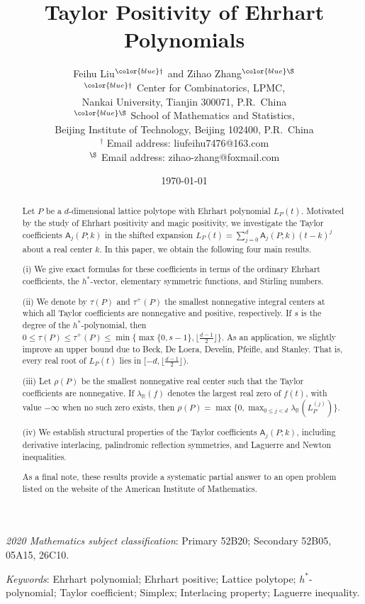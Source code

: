 \documentclass[reqno, 12pt]{article}
\title{Taylor Positivity of Ehrhart Polynomials}
\author{Feihu Liu$^{\color{blue} \dag}$ and Zihao Zhang$^{\color{blue} \S}$
\\[2mm]
{\small $^{\color{blue} \dag}$ Center for Combinatorics, LPMC,}\\[-0.8ex]
{\small Nankai University, Tianjin 300071, P.R.~China}\\
{\small $^{\color{blue} \S}$ School of Mathematics and Statistics,}\\[-0.8ex]
{\small Beijing Institute of Technology, Beijing 102400, P.R.~China}\\
{\small {\color{blue} $^\dag$} Email address: liufeihu7476@163.com}\\
{\small {\color{blue} $^\S$} Email address: zihao-zhang@foxmail.com}\\
}
\date{\today}
\numberwithin{equation}{section}
\theoremstyle{definition}
\newcommand{\A}{\mathsf{A}}
\begin{document}
\maketitle

\begin{abstract}
Let $P$ be a $d$-dimensional lattice polytope with Ehrhart polynomial $L_P(t)$. Motivated by the study of Ehrhart positivity and magic positivity, we investigate the Taylor coefficients $\mathsf{A}_j(P;k)$ in the shifted expansion $L_P(t)=\sum_{j=0}^{d}\mathsf{A}_j(P;k)(t-k)^j$ about a real center $k$. In this paper, we obtain the following four main results.

(i) We give exact formulas for these coefficients in terms of the ordinary Ehrhart coefficients, the $h^*$-vector, elementary symmetric functions, and Stirling numbers.

(ii) We denote by $\tau(P)$ and $\tau^+(P)$ the smallest nonnegative integral centers at which all Taylor coefficients are nonnegative and positive, respectively. If $s$ is the degree of the $h^*$-polynomial, then $0\leq\tau(P)\leq\tau^+(P)\leq\min\{\max\{0,s-1\},\lfloor\frac{d-1}{2}\rfloor\}$. As an application, we slightly improve an upper bound due to Beck, De Loera, Develin, Pfeifle, and Stanley. That is, every real root of $L_P(t)$ lies in $[-d,\lfloor\frac{d-1}{2}\rfloor)$.

(iii) Let $\rho(P)$ be the smallest nonnegative real center such that the Taylor coefficients are nonnegative. If $\lambda_{\mathbb{R}}(f)$ denotes the largest real zero of $f(t)$, with value $-\infty$ when no such zero exists, then
$\rho(P)=\max\{0,\max_{0\leq j<d}\lambda_{\mathbb{R}}\!(L_P^{(j)})\}$.

(iv) We establish structural properties of the Taylor coefficients $\A_j(P;k)$, including derivative interlacing, palindromic reflection symmetries, and Laguerre and Newton inequalities.

As a final note, these results provide a systematic partial answer to an open problem listed on the website of the American Institute of Mathematics.
\end{abstract}

\noindent
\begin{small}
\emph{2020 Mathematics subject classification}: Primary 52B20; Secondary 52B05, 05A15, 26C10.
\end{small}

\noindent
\begin{small}
\emph{Keywords}: Ehrhart polynomial; Ehrhart positive; Lattice polytope; $h^*$-polynomial; Taylor coefficient; Simplex; Interlacing property; Laguerre inequality.
\end{small}
\end{document}
